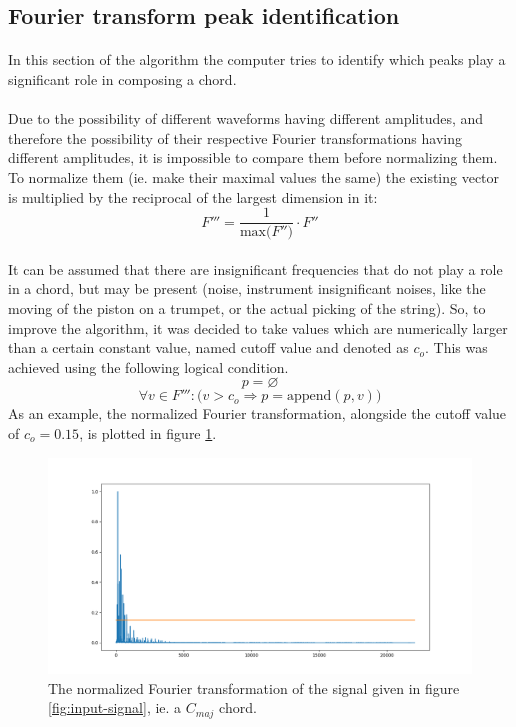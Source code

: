 \documentclass{article}
\begin{document}
\subsection{Fourier transform peak identification} 
\paragraph*{}
In this section of the algorithm the computer tries to identify which peaks 
play a significant role in composing a chord. 

\paragraph*{} 
Due to the possibility of different waveforms having different amplitudes, and
therefore the possibility of their respective Fourier transformations having
different amplitudes, it is impossible to compare them before normalizing them.
To normalize them (ie. make their maximal values the same) the existing vector
is multiplied by the reciprocal of the largest dimension in it:
$$F''' = \frac{1}{\text{max(}F''\text{)}} \cdot F''$$

\paragraph*{}
It can be assumed that there are insignificant frequencies that do not play a
role in a chord, but may be present (noise, instrument insignificant noises,
like the moving of the piston on a trumpet, or the actual picking of the
string). So, to improve the algorithm, it was decided to take values which are
numerically larger than a certain constant value, named cutoff value and
denoted as $c_o$. This was achieved using the following logical condition. 
$$p = \varnothing$$
$$\forall v \in F''' : \bigg(v > c_o \Rightarrow p = \text{append}\left(p, v
\right) \bigg)$$
As an example, the normalized Fourier transformation, alongside the cutoff 
value of $c_o = 0.15$, is plotted in figure \ref{fig:fourier-signal}.
\begin{figure}[ht]
	\centering
	\includegraphics[width=\textwidth]{img/fourier-signal}
	\caption{The normalized Fourier transformation of the signal given in 
	figure \ref{fig:input-signal}, ie. a $C_{maj}$ chord.}
	\label{fig:fourier-signal}
\end{figure}
\end{document}
